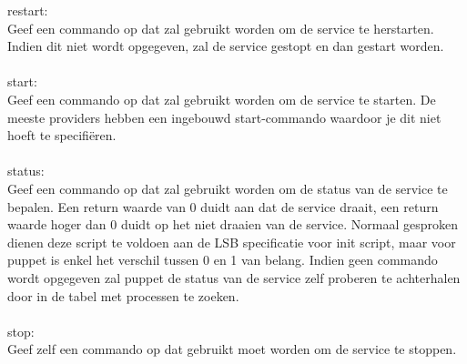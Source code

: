 %
restart:\\
Geef een commando op dat zal gebruikt worden om de service te herstarten. Indien dit niet wordt opgegeven, zal de service gestopt en dan gestart worden.\\\\
%
start:\\
Geef een commando op dat zal gebruikt worden om de service te starten. De meeste providers hebben een ingebouwd start-commando waardoor je dit niet hoeft te specifi\"eren.\\\\
%
status:\\
Geef een commando op dat zal gebruikt worden om de status van de service te bepalen. Een return waarde van 0 duidt aan dat de service draait, een return waarde hoger dan 0 duidt op het niet draaien van de service. Normaal gesproken dienen deze script te voldoen aan de LSB specificatie voor init script, maar voor puppet is enkel het verschil tussen 0 en 1 van belang. Indien geen commando wordt opgegeven zal puppet de status van de service zelf proberen te achterhalen door in de tabel met processen te zoeken.\\\\
%
stop:\\
Geef zelf een commando op dat gebruikt moet worden om de service te stoppen.\\\\
